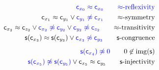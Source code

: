 	\begin{align*}
\colN \mc_{x_0} \mEQ \mc_{x_0}
\tag*{\( \mEQ \)-reflexivity}
\\
{\mc_{x_1} \mEQ \mc_{y_1}} \lor {\colN \mc_{y_1} \mNE \mc_{x_1}}
\tag*{\( \mEQ \)-symmetry}
\\
{\mc_{x_2} \mEQ \mc_{z_2}} \lor {\colN \mc_{x_2} \mNE \mc_{y_2}} \lor {\colN \mc_{y_2}\mNE \mc_{z_2}}
\tag*{\( \mEQ \)-transitivity}
\\
{ \msucc(\mc_{x_3}) \mEQ \msucc(\mc_{y_3})} \lor {\colN \mc_{x_3}\mNE \mc_{y_3}}
\tag*{\( \msucc \)-congruence}
\\[0.5em]
{\colN \msucc(\mc_{x_4})\mNE 0}
\tag*{\( 0\not\in\image(\msucc) \)}
\\
{\colN \msucc(\mc_{x_5}) \mNE \msucc(\mc_{y_5})} \lor \mc_{x_5 }\mEQ \mc_{y_5}
\tag*{\( \msucc \)-injectivity}
\end{align*}



%



